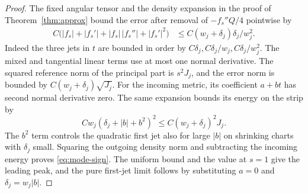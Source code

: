 \documentclass[11pt,letterpaper]{article}
\numberwithin{equation}{section}
\begin{document}
\begin{proof}
The fixed angular tensor and the density expansion in the proof
of Theorem~\ref{thm:approx} bound the error after removal of
\(-f_s''Q/4\) pointwise by
\[
 \begin{aligned}
 C\bigl(|f_s|+|f_s'|+|f_s|\,|f_s''|+|f_s'|^2\bigr)
 &\le C(w_j+\delta_j)\delta_j/w_j^2 .
 \end{aligned}
\]
Indeed the three jets in \(t\) are bounded in order by
\(C\delta_j,C\delta_j/w_j,C\delta_j/w_j^2\).
The mixed and tangential linear terms use at most one normal
derivative. The squared reference norm of the principal part is
\(s^2J_j\), and the error norm is bounded by
\(C(w_j+\delta_j)\sqrt{J_j}\). For the incoming metric, its
coefficient \(a+bt\) has second normal derivative zero.
The same expansion bounds its energy on the strip by
\[
 Cw_j(\delta_j+|b|+b^2)^2
 \le C(w_j+\delta_j)^2J_j .
\]
The \(b^2\) term controls the quadratic first jet also for large
\(|b|\) on shrinking charts with \(\delta_j\) small. Squaring the
outgoing density norm and subtracting the incoming energy proves
\eqref{eq:mode-sign}. The uniform bound and the value at \(s=1\)
give the leading peak, and the pure first-jet limit follows by
substituting \(a=0\) and \(\delta_j=w_j|b|\).
\end{proof}
\end{document}

